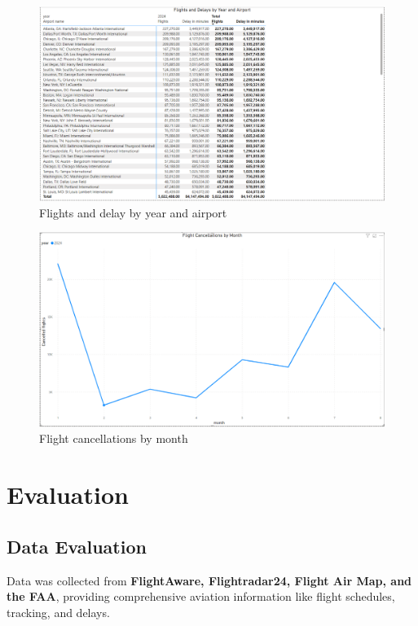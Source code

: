\documentclass[12pt,a4paper]{article}
\begin{document}
\begin{figure}[H]
    \begin{center}
        \includegraphics[width=\textwidth]{Images/chart7.png}
        \newline
        \caption{Flights and delay by year and airport}
    \end{center}
\end{figure}
\begin{figure}[H]
    \begin{center}
        \includegraphics[width=\textwidth]{Images/chart8.png}
        \newline
        \caption{Flight cancellations by month}
    \end{center}
\end{figure}

\section{Evaluation}
\subsection{Data Evaluation}
Data was collected from \textbf{FlightAware, Flightradar24, Flight Air Map, and the FAA}, providing comprehensive aviation information like flight schedules, tracking, and delays.
\end{document}
